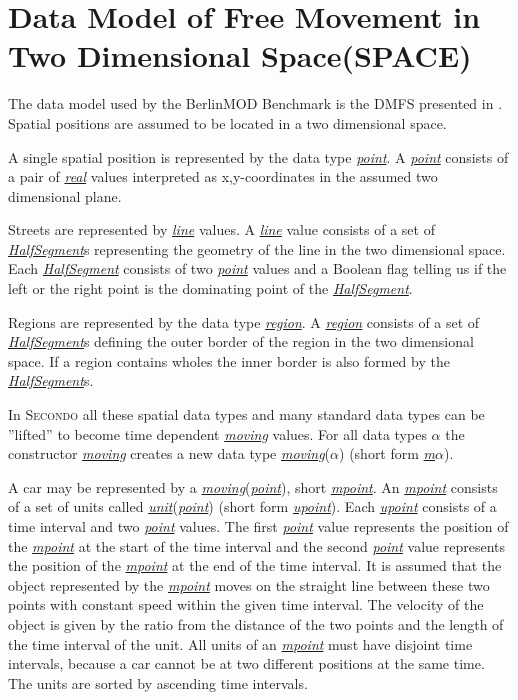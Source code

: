 \documentclass[a4paper]{article}
\newcommand{\secondo}{\textsc{Secondo}}
\newcommand{\bmodb} {BerlinMOD Benchmark}
\newcommand{\dt}[1]{\textsl{\underline{#1}}}
\begin{document}
\section{Data Model of Free Movement in Two Dimensional Space(SPACE)}
\label{sec:bmodbdatamod}
The data model used by the \bmodb{} is the DMFS presented in \cite{STDTModelingQueryingMOinDErwig,DataModelDataStructureGueting,RepresentingMovingObjectsGueting}.
Spatial positions are assumed to be located in a two dimensional space.

A single spatial
position is represented by the data type \dt{point}. A \dt{point} consists of a pair of
\dt{real} values interpreted as x,y-coordinates in the assumed two dimensional plane.

Streets are represented by \dt{line} values. A \dt{line} value consists of a set
of \dt{HalfSegment}s representing the geometry of the line in the two dimensional space.
Each \dt{HalfSegment} consists of two \dt{point} values and a Boolean flag telling us
if the left or the right point is the dominating point of the \dt{HalfSegment}.

Regions are represented by the data type \dt{region}. A \dt{region} consists of
a set of \dt{HalfSegment}s defining the outer border of the region in
the two dimensional space. If a region contains wholes the inner border is also
formed by the \dt{HalfSegment}s.

In \secondo{} all these spatial data types and many standard data types can be
''lifted'' to become time dependent \dt{moving} values. For all data types \dt{$\alpha$}
the constructor \dt{moving} creates a new data type \dt{moving}(\dt{$\alpha$})
(short form \dt{m$\alpha$}).

A car may be represented by a \dt{moving}(\dt{point}), short \dt{mpoint}.
An \dt{mpoint} consists of a set of units called
\dt{unit}(\dt{point}) (short form \dt{upoint}). Each \dt{upoint} consists of a time
interval and two \dt{point} values. The first \dt{point} value represents the
position of the \dt{mpoint} at the start of the time interval and the second
\dt{point} value represents the position of the \dt{mpoint} at the end of the
time interval. It is assumed that the object represented by the \dt{mpoint}
moves on the straight line between these two points with constant speed within the
given time interval. The velocity of the object is given by the ratio from the
distance of the two points and the length of the time interval of the unit.
All units of an \dt{mpoint} must have disjoint time intervals, because a car
cannot be at two different positions at the same time.
The units are sorted by ascending time intervals.
\end{document}
